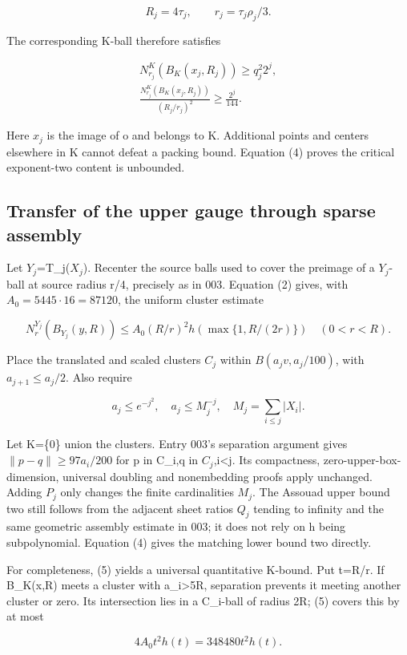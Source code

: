 \documentclass[
  11pt,
]{article}
\theoremstyle{remark}\newtheorem{remark}[theorem]{Remark}
\begin{document}
\[
R_j=4\tau_j,\qquad r_j=\tau_j\rho_j/3.
\]

The corresponding K-ball therefore satisfies

\[
\begin{gathered}N_{r_j}^K(B_K(x_j,R_j))\ge q_j^2 2^j,\\ \frac{N_{r_j}^K(B_K(x_j,R_j))}{(R_j/r_j)^2}\ge\frac{2^j}{144}.\end{gathered}\tag{4}
\]

Here \(x_j\) is the image of o and belongs to K. Additional points and
centers elsewhere in K cannot defeat a packing bound. Equation (4)
proves the critical exponent-two content is unbounded.

\subsection{Transfer of the upper gauge through sparse
assembly}\label{transfer-of-the-upper-gauge-through-sparse-assembly}

Let \(Y_j\)=T\_j(\(X_j\)). Recenter the source balls used to cover the
preimage of a \(Y_j\)-ball at source radius r/4, precisely as in 003.
Equation (2) gives, with \(A_0=5445\cdot16=87120\), the uniform cluster
estimate

\[
N_r^{Y_j}(B_{Y_j}(y,R))\le A_0(R/r)^2h(\max\{1,R/(2r)\})\quad(0<r<R).\tag{5}
\]

Place the translated and scaled clusters \(C_j\) within
\(B(a_jv,a_j/100)\), with \(a_{j+1}\le a_j/2\). Also require

\[
a_j\le e^{-j^2},\quad a_j\le M_j^{-j},\quad M_j=\sum_{i\le j}|X_i|.
\]

Let K=\{0\} union the clusters. Entry 003's separation argument gives
\(\|p-q\|\ge97a_i/200\) for p in C\_i,q in \(C_j\),i\textless j. Its
compactness, zero-upper-box-dimension, universal doubling and
nonembedding proofs apply unchanged. Adding \(P_j\) only changes the
finite cardinalities \(M_j\). The Assouad upper bound two still follows
from the adjacent sheet ratios \(Q_j\) tending to infinity and the same
geometric assembly estimate in 003; it does not rely on h being
subpolynomial. Equation (4) gives the matching lower bound two directly.

For completeness, (5) yields a universal quantitative K-bound. Put
t=R/r. If B\_K(x,R) meets a cluster with a\_i\textgreater5R, separation
prevents it meeting another cluster or zero. Its intersection lies in a
C\_i-ball of radius 2R; (5) covers this by at most

\[
4A_0t^2h(t)=348480t^2h(t).
\]
\end{document}
